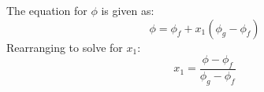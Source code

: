 The equation for \( \phi \) is given as:  
\[
\phi = \phi_f + x_1 (\phi_g - \phi_f)
\]  
Rearranging to solve for \( x_1 \):  
\[
x_1 = \frac{\phi - \phi_f}{\phi_g - \phi_f}
\]